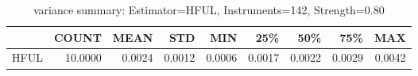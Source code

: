 \begin{table}[ht]
\centering
\caption{variance summary: Estimator=HFUL, Instruments=142, Strength=0.80}
\begin{tabular}{lrrrrrrrr}
\toprule
 & COUNT & MEAN & STD & MIN & 25\% & 50\% & 75\% & MAX \\
\midrule
HFUL & 10.0000 & 0.0024 & 0.0012 & 0.0006 & 0.0017 & 0.0022 & 0.0029 & 0.0042 \\
\bottomrule
\end{tabular}
\end{table}
